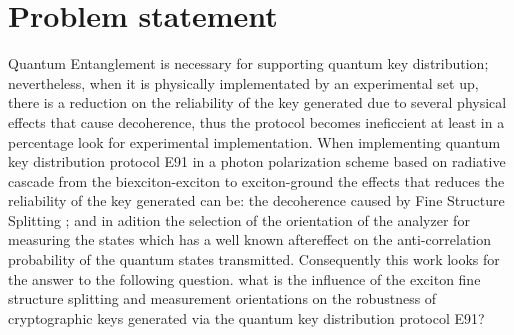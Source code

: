 \section{Problem statement}

Quantum Entanglement is necessary for supporting quantum key distribution; nevertheless, when it is physically implementated by an experimental set up, there is a reduction on the reliability of the key generated due to several physical effects that cause decoherence, thus the protocol  becomes ineficcient at least in a percentage {\huge look for experimental implementation}.
When implementing quantum key distribution protocol E91 in a photon polarization scheme based on radiative cascade from the biexciton-exciton to exciton-ground the effects that reduces the reliability of the key generated can be: the decoherence caused by Fine Structure Splitting \cite{hernandez2023effects}; and in adition the selection of the orientation of the analyzer for measuring the states which has a well known aftereffect on the anti-correlation probability of the quantum states transmitted\cite{grynberg2010introduction}. Consequently this work looks for the answer to the following question. what is the influence of the exciton fine structure splitting and measurement orientations on the robustness of cryptographic keys generated via the quantum key distribution protocol E91?



